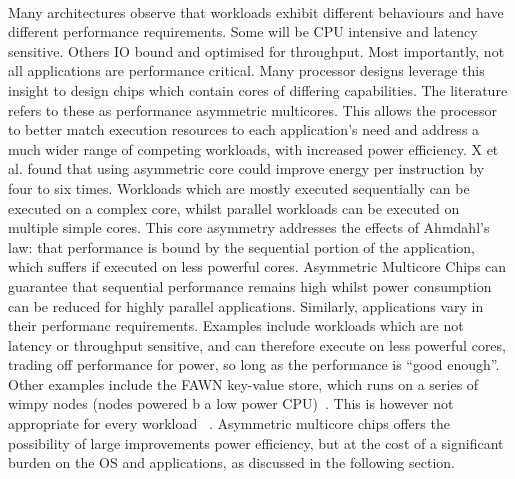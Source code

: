 \paragraph{} Many architectures observe that workloads exhibit different behaviours and have different performance requirements. Some will be CPU intensive and latency sensitive. Others IO bound and optimised for throughput. Most importantly, not all applications are performance critical. Many processor designs
leverage this insight to design chips which contain cores of differing 
capabilities. The literature refers to these as performance asymmetric multicores. This allows the processor to better match execution resources to each 
application's need and address a much wider range of competing workloads, 
with increased power efficiency. X et al. found that using asymmetric core could improve energy per instruction by four to six times. Workloads which are mostly executed sequentially can be executed on a complex core, whilst parallel workloads can be executed on multiple simple cores. This core asymmetry addresses the effects of Ahmdahl's law: that performance is bound by the sequential portion of the application, which suffers if executed on less powerful cores. Asymmetric Multicore Chips can guarantee that sequential performance remains high whilst power consumption can be reduced for highly parallel applications. Similarly, applications vary in their performanc requirements. Examples include workloads which are not latency or throughput sensitive, and can therefore execute on less powerful cores, trading off performance for power, so long as the performance is ``good enough''. Other examples include the FAWN key-value store, which runs on a series of wimpy nodes (nodes powered b a low power CPU)~\cite{andersen2009fawn}. This is however not appropriate for every workload ~\cite{lang2010nonwimpy}.
Asymmetric multicore chips offers the possibility of large improvements power efficiency, but at the cost of a significant burden on the OS and applications,
as discussed in the following section. 

